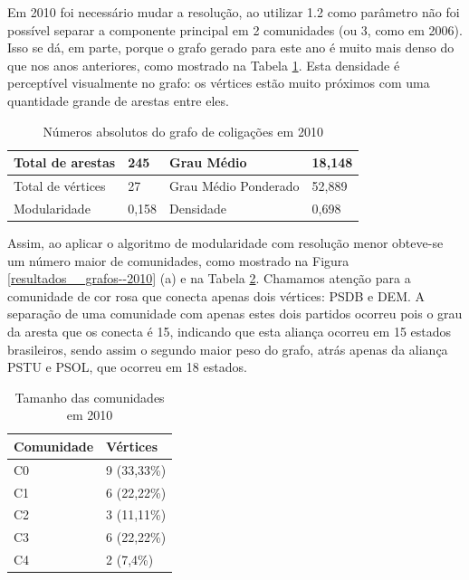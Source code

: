 Em 2010 foi necessário mudar a resolução, ao utilizar 1.2 como parâmetro não foi possível separar a componente principal em 2 comunidades (ou 3, como em 2006). Isso se dá, em parte, porque o grafo gerado para este ano é muito mais denso do que nos anos anteriores, como mostrado na Tabela \ref{table-2010a}. Esta densidade é perceptível visualmente no grafo: os vértices estão muito próximos com uma quantidade grande de arestas entre eles. 

\begin{table}[H]
\centering
\label{table-2010a}
\begin{tabular}{|l|l|l|l|}
\hline
Total de arestas  & 245 & Grau Médio           & 18,148 \\ \hline
Total de vértices & 27 & Grau Médio Ponderado & 52,889 \\ \hline
Modularidade      & 0,158 & Densidade            & 0,698 \\ \hline
\end{tabular}
\caption{Números absolutos do grafo de coligações em 2010}
\end{table}

Assim, ao aplicar o algoritmo de modularidade com resolução menor obteve-se um número maior de comunidades, como mostrado na Figura \ref{resultados__grafos--2010} (a) e na Tabela \ref{table-2010b}. Chamamos atenção para a comunidade de cor rosa que conecta apenas dois vértices: \gls{PSDB} e \gls{DEM}. A separação de uma comunidade com apenas estes dois partidos ocorreu pois o grau da aresta que os conecta é 15, indicando que esta aliança ocorreu em 15 estados brasileiros, sendo assim o segundo maior peso do grafo, atrás apenas da aliança \gls{PSTU} e \gls{PSOL}, que ocorreu em 18 estados.

\begin{table}[H]
\centering
\label{table-2010b}
\begin{tabular}{|l|l|}
\hline
Comunidade & Vértices \\ \hline
C0         &     9 (33,33\%)                \\ \hline
C1         &     6 (22,22\%)                \\ \hline
C2         &       3 (11,11\%)               \\ \hline
C3         &       6 (22,22\%)               \\ \hline
C4         &       2 (7,4\%)               \\ \hline
\end{tabular}
\caption{Tamanho das comunidades em 2010}
\end{table}

